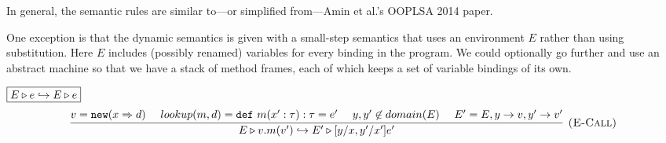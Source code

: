 \documentclass{llncs}
\newcommand{\keywadj}[1]{\mathtt{#1}}
\newcommand{\keyw}[1]{\keywadj{#1}~}
\begin{document}
In general, the semantic rules are similar to---or simplified from---Amin et al.'s
OOPLSA 2014 paper.

One exception is that the dynamic semantics is given with a small-step semantics that uses an environment $E$ rather than using substitution.  Here $E$ includes (possibly renamed) variables for every binding in the program.  We could optionally go further and use an abstract machine so that we have a stack of method frames, each of which keeps a set of variable bindings of its own.

$\fbox{$E \triangleright e \hookrightarrow E \triangleright e$}$
\[
\begin{array}{c}
\infer[\textsc{(E-Call)}]
  {E \triangleright v.m(v') \hookrightarrow E' \triangleright [y/x,y'/x']e'}
  {v = \keywadj{new}(x \Rightarrow d) ~~~~
  lookup(m,d) = \keyw{def} m(x':\tau):\tau = e' ~~~~
  y,y' \not\in domain(E) ~~~~
  E' = E, y \rightarrow v, y' \rightarrow v'}%
\end{array}
\]
\end{document}

